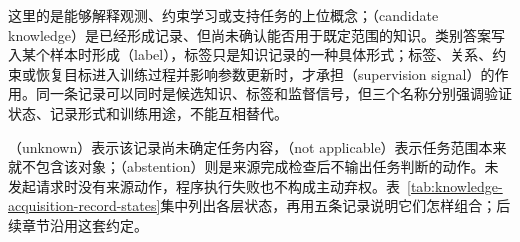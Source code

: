 这里的是能够解释观测、约束学习或支持任务的上位概念；（candidate knowledge）是已经形成记录、但尚未确认能否用于既定范围的知识。类别答案写入某个样本时形成（label），标签只是知识记录的一种具体形式；标签、关系、约束或恢复目标进入训练过程并影响参数更新时，才承担（supervision signal）的作用。同一条记录可以同时是候选知识、标签和监督信号，但三个名称分别强调验证状态、记录形式和训练用途，不能互相替代。

（unknown）表示该记录尚未确定任务内容，（not applicable）表示任务范围本来就不包含该对象；（abstention）则是来源完成检查后不输出任务判断的动作。未发起请求时没有来源动作，程序执行失败也不构成主动弃权。表~\ref{tab:knowledge-acquisition-record-states}集中列出各层状态，再用五条记录说明它们怎样组合；后续章节沿用这套约定。


